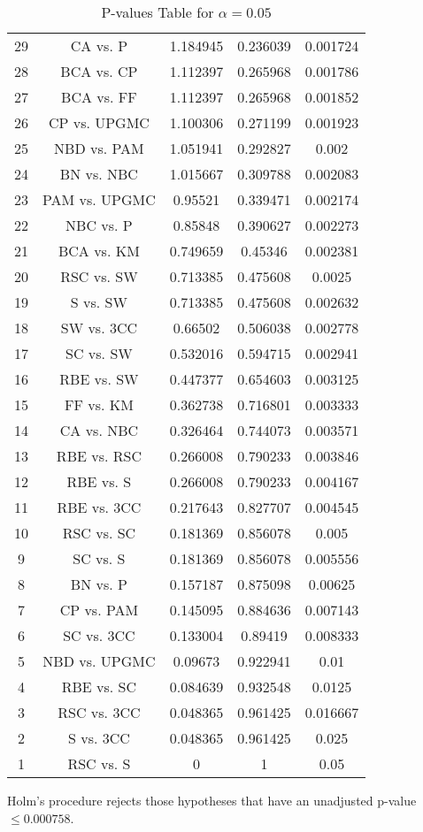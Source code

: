 \documentclass[a4paper,10pt]{article}
\begin{document}
\begin{landscape}
\begin{table}[!htp]
\begin{tabular}{ccccc}
29&CA vs. P&1.184945&0.236039&0.001724\\
28&BCA vs. CP&1.112397&0.265968&0.001786\\
27&BCA vs. FF&1.112397&0.265968&0.001852\\
26&CP vs. UPGMC&1.100306&0.271199&0.001923\\
25&NBD vs. PAM&1.051941&0.292827&0.002\\
24&BN vs. NBC&1.015667&0.309788&0.002083\\
23&PAM vs. UPGMC&0.95521&0.339471&0.002174\\
22&NBC vs. P&0.85848&0.390627&0.002273\\
21&BCA vs. KM&0.749659&0.45346&0.002381\\
20&RSC vs. SW&0.713385&0.475608&0.0025\\
19&S vs. SW&0.713385&0.475608&0.002632\\
18&SW vs. 3CC&0.66502&0.506038&0.002778\\
17&SC vs. SW&0.532016&0.594715&0.002941\\
16&RBE vs. SW&0.447377&0.654603&0.003125\\
15&FF vs. KM&0.362738&0.716801&0.003333\\
14&CA vs. NBC&0.326464&0.744073&0.003571\\
13&RBE vs. RSC&0.266008&0.790233&0.003846\\
12&RBE vs. S&0.266008&0.790233&0.004167\\
11&RBE vs. 3CC&0.217643&0.827707&0.004545\\
10&RSC vs. SC&0.181369&0.856078&0.005\\
9&SC vs. S&0.181369&0.856078&0.005556\\
8&BN vs. P&0.157187&0.875098&0.00625\\
7&CP vs. PAM&0.145095&0.884636&0.007143\\
6&SC vs. 3CC&0.133004&0.89419&0.008333\\
5&NBD vs. UPGMC&0.09673&0.922941&0.01\\
4&RBE vs. SC&0.084639&0.932548&0.0125\\
3&RSC vs. 3CC&0.048365&0.961425&0.016667\\
2&S vs. 3CC&0.048365&0.961425&0.025\\
1&RSC vs. S&0&1&0.05\\
\hline
\end{tabular}
\caption{P-values Table for $\alpha=0.05$}
\end{table}Holm's procedure rejects those hypotheses that have an unadjusted p-value $\le0.000758$.


\end{landscape}
\end{document}
